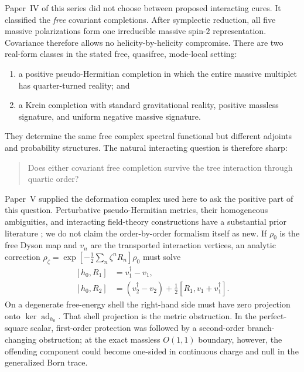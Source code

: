 \documentclass[11pt]{article}
\theoremstyle{definition}
\theoremstyle{remark}
\newcommand{\dg}{\dagger}
\newcommand{\ad}{\operatorname{ad}}
\begin{document}
Paper~IV of this series \cite{paperIV} did not choose between proposed
interacting cures.  It classified the \emph{free} covariant completions.
After symplectic reduction, all five massive polarizations form one
irreducible massive spin-$2$ representation.  Covariance therefore
allows no helicity-by-helicity compromise.  There are two real-form
classes in the stated free, quasifree, mode-local setting:
\begin{enumerate}
\item a positive pseudo-Hermitian completion in which the entire massive
multiplet has quarter-turned reality; and
\item a Krein completion with standard gravitational reality, positive
massless signature, and uniform negative massive signature.
\end{enumerate}
They determine the same free complex spectral functional but different
adjoints and probability structures.  The natural interacting question
is therefore sharp:
\begin{quote}
Does either covariant free completion survive the tree interaction
through quartic order?
\end{quote}

Paper~V \cite{paperV} supplied the deformation complex used here to ask
the positive part of this question.  Perturbative pseudo-Hermitian
metrics, their homogeneous ambiguities, and interacting field-theory
constructions have a substantial prior literature
\cite{MostafazadehMetric,BBJQFT}; we do not claim the order-by-order
formalism itself as new.  If $\rho_0$ is the free Dyson map and
$v_n$ are the transported interaction vertices, an analytic correction
$\rho_\zeta=\exp[-\tfrac12\sum_n\zeta^nR_n]\rho_0$ must solve
\begin{align}\label{eq:defcomplex}
[h_0,R_1]&=v_1^{\dg}-v_1,\nonumber\\
[h_0,R_2]&=(v_2^{\dg}-v_2)
+\frac12[R_1,v_1+v_1^{\dg}].
\end{align}
On a degenerate free-energy shell the right-hand side must have zero
projection onto $\ker\ad_{h_0}$.  That shell projection is the metric
obstruction.  In the perfect-square scalar, first-order protection was
followed by a second-order branch-changing obstruction; at the exact
massless $O(1,1)$ boundary, however, the offending component could become
one-sided in continuous charge and null in the generalized Born trace.
\end{document}
